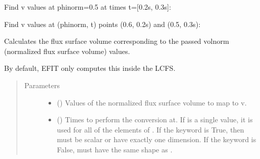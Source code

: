 \documentclass[letterpaper,10pt,english]{sphinxmanual}
\begin{document}
\begin{fulllineitems}
\begin{fulllineitems}
Find v values at phinorm=0.5 at times t={[}0.2s, 0.3s{]}:

\begin{sphinxVerbatim}[commandchars=\\\{\}]
   \PYG{p}{[} \PYG{p}{]}
\end{sphinxVerbatim}

Find v values at (phinorm, t) points (0.6, 0.2s) and (0.5, 0.3s):

\begin{sphinxVerbatim}[commandchars=\\\{\}]
  \PYG{p}{[} \PYG{p}{]} \PYG{p}{[} \PYG{p}{]} 
\end{sphinxVerbatim}

\end{fulllineitems}


\begin{fulllineitems}
\label{\detokenize{eqtools:eqtools.core.Equilibrium.volnorm2v}}
Calculates the flux surface volume corresponding to the passed volnorm (normalized flux surface volume) values.

By default, EFIT only computes this inside the LCFS.
\begin{quote}\begin{description}
\item[{Parameters}] \leavevmode\begin{itemize}
\item {} 
 () \textendash{} Values of the normalized
flux surface volume to map to v.

\item {} 
 () \textendash{} Times to perform the conversion at.
If  is a single value, it is used for all of the elements of
. If the  keyword is True, then  must be scalar
or have exactly one dimension. If the  keyword is False,
 must have the same shape as .


\end{itemize}
\end{description}
\end{quote}
\end{fulllineitems}
\end{fulllineitems}
\end{document}
